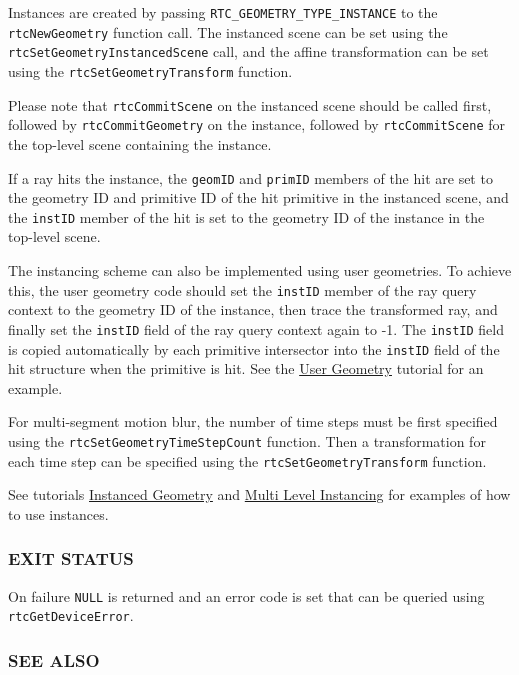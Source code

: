 Instances are created by passing \texttt{RTC\_GEOMETRY\_TYPE\_INSTANCE}
to the \texttt{rtcNewGeometry} function call. The instanced scene can be
set using the \texttt{rtcSetGeometryInstancedScene} call, and the affine
transformation can be set using the \texttt{rtcSetGeometryTransform}
function.

Please note that \texttt{rtcCommitScene} on the instanced scene should
be called first, followed by \texttt{rtcCommitGeometry} on the instance,
followed by \texttt{rtcCommitScene} for the top-level scene containing
the instance.

If a ray hits the instance, the \texttt{geomID} and \texttt{primID}
members of the hit are set to the geometry ID and primitive ID of the
hit primitive in the instanced scene, and the \texttt{instID} member of
the hit is set to the geometry ID of the instance in the top-level
scene.

The instancing scheme can also be implemented using user geometries. To
achieve this, the user geometry code should set the \texttt{instID}
member of the ray query context to the geometry ID of the instance, then
trace the transformed ray, and finally set the \texttt{instID} field of
the ray query context again to -1. The \texttt{instID} field is copied
automatically by each primitive intersector into the \texttt{instID}
field of the hit structure when the primitive is hit. See the
\hyperref[user-geometry]{User Geometry} tutorial for an example.

For multi-segment motion blur, the number of time steps must be first
specified using the \texttt{rtcSetGeometryTimeStepCount} function. Then
a transformation for each time step can be specified using the
\texttt{rtcSetGeometryTransform} function.

See tutorials \hyperref[instanced-geometry]{Instanced Geometry} and
\hyperref[multi-level-instancing]{Multi Level Instancing} for examples
of how to use instances.

\subsubsection{EXIT STATUS}\label{exit-status}

On failure \texttt{NULL} is returned and an error code is set that can
be queried using \texttt{rtcGetDeviceError}.

\subsubsection{SEE ALSO}\label{see-also}

